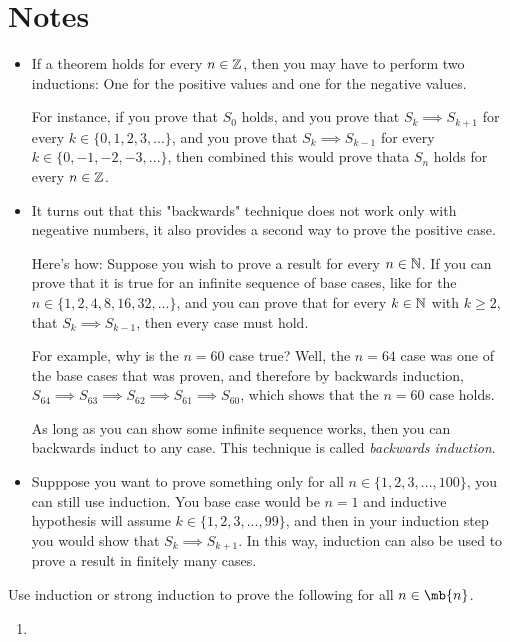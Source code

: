 \section*{Notes}

\begin{itemize}
	\item If a theorem holds for every $n \in \mathbb{Z}$, then you may have to perform two inductions: One for the positive values and one for the negative values.

		For instance, if you prove that $S_0$ holds, and you prove that $S_k \implies S_{k+1}$ for every $k \in \{0,1,2,3,...\}$, and you prove that $S_k \implies S_{k-1}$ for every $k \in \{0,-1,-2,-3,...\}$, then combined this would prove thata $S_n$ holds for every $n \in \mathbb{Z}$.

	\item It turns out that this "backwards" technique does not work only with negeative numbers, it also provides a second way to prove the positive case. 

		Here's how: Suppose you wish to prove a result for every $n \in \mathbb{N}$. If you can prove that it is true for an infinite sequence of base cases, like for the $n \in \{1, 2, 4, 8, 16, 32, ...\}$, and you can prove that for every $k \in \mathbb{N}$ with $k \geq 2$, that $S_k \implies S_{k-1}$, then every case must hold.

		For example, why is the $n = 60$ case true? Well, the $n = 64$ case was one of the base cases that was proven, and therefore by backwards induction, $S_64 \implies S_63 \implies S_62 \implies S_61 \implies S_60$, which shows that the $n = 60$ case holds.

		As long as you can show some infinite sequence works, then you can backwards induct to any case. This technique is called \emph{backwards induction}.


	\item Supppose you want to prove something only for all $n \in \{1, 2, 3, ..., 100\}$, you can still use induction. You base case would be $n = 1$ and inductive hypothesis will assume $k \in \{1,2,3,...,99\}$, and then in your induction step you would show that $S_k \implies S_{k+1}$. In this way, induction can also be used to prove a result in finitely many cases.
\end{itemize}

\bp Use induction or strong induction to prove the following for all $n \in \mb{n}$.
\begin{enumerate}
	\item 
\end{enumerate}
\ep
